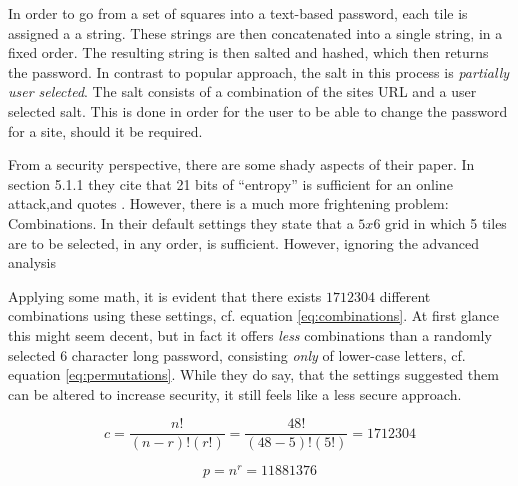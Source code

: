 			In order to go from a set of squares into a text-based password, each tile is assigned a a string. These strings are then concatenated into a single string, in a fixed order. The resulting string is then salted and hashed, which then returns the password. In contrast to popular approach, the salt in this process is \emph{ partially user selected}. The salt consists of a combination of the sites URL and a user selected salt. This is done in order for the user to be able to change the password for a site, should it be required.

			From a security perspective, there are some shady aspects of their paper. In section 5.1.1 they cite that 21 bits of ``entropy'' is sufficient for an online attack,and quotes \cite{florencio2014}. However, there is a much more frightening problem: Combinations. In their default settings they state that a $5x6$ grid in which 5 tiles are to be selected, in any order, is sufficient. However, ignoring the advanced analysis

			Applying some math, it is evident that there exists $1712304$ different combinations using these settings, cf. equation \ref{eq:combinations}. At first glance this might seem decent, but in fact it offers \emph{less} combinations than a randomly selected $6$ character long password, consisting \emph{only} of lower-case letters, cf. equation \ref{eq:permutations}. While they do say, that the settings suggested them can be altered to increase security, it still feels like a less secure approach.

			\begin{equation}
				c = \frac{n!}{(n-r)!(r!)} = \frac{48!}{(48-5)!(5!)} = 1712304
				\label{eq:combinations}
			\end{equation}

			\begin{equation}
				p = n^r = 11881376
				\label{eq:permutations}
			\end{equation}

